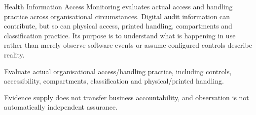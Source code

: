 Health Information Access Monitoring evaluates actual access and handling practice across organisational circumstances. Digital audit information can contribute, but so can physical access, printed handling, compartments and classification practice. Its purpose is to understand what is happening in use rather than merely observe software events or assume configured controls describe reality.



Evaluate actual organisational access/\allowbreak{}handling practice, including controls, accessibility, compartments, classification and physical/\allowbreak{}printed handling.



Evidence supply does not transfer business accountability, and observation is not automatically independent assurance.


